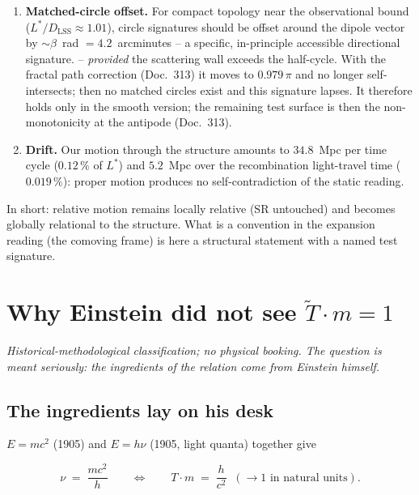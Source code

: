 \begin{enumerate}
  \item \textbf{Matched-circle offset.} For compact topology near
        the observational bound ($L^{*}/D_\text{LSS} \approx
        1.01$), circle signatures should be offset around the
        dipole vector by $\sim\beta$~rad $= 4.2$~arcminutes -- a
        specific, in-principle accessible directional signature.
        -- \emph{provided} the scattering wall exceeds the
        half-cycle. With the fractal path correction (Doc.~313) it
        moves to $0.979\,\pi$ and no longer self-intersects; then
        no matched circles exist and this signature lapses. It
        therefore holds only in the smooth version; the remaining
        test surface is then the non-monotonicity at the antipode
        (Doc.~313).
  \item \textbf{Drift.} Our motion through the structure amounts
        to $34.8$~Mpc per time cycle ($0.12\,\%$ of $L^{*}$) and
        $5.2$~Mpc over the recombination light-travel time
        ($0.019\,\%$): proper motion produces no
        self-contradiction of the static reading.
\end{enumerate}

In short: relative motion remains locally relative (SR untouched)
and becomes globally relational to the structure. What is a
convention in the expansion reading (the comoving frame) is here a
structural statement with a named test signature.

\chapter{Why Einstein did not see $\tilde T \cdot m = 1$}

\emph{Historical-methodological classification; no physical
booking. The question is meant seriously: the ingredients of the
relation come from Einstein himself.}

\section{The ingredients lay on his desk}

$E = mc^2$ (1905) and $E = h\nu$ (1905, light quanta) together
give

\begin{equation}
  \nu \;=\; \frac{mc^2}{h}
  \qquad\Longleftrightarrow\qquad
  T \cdot m \;=\; \frac{h}{c^2} \;\;(\to 1
  \text{ in natural units}).
\end{equation}

